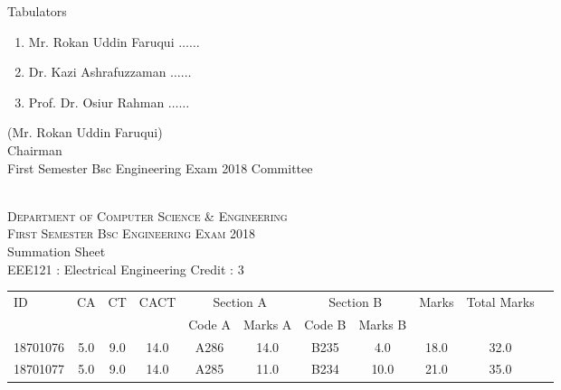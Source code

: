 \documentclass[12pt]{article}
\begin{document}
            \begin{table}[hb]
            	\centering
            \begin{minipage}[b]{0.5\linewidth} %
            {\centering Tabulators }
            \begin{enumerate}
                \item Mr. Rokan Uddin Faruqui \hspace*{1ex} $\ldots \ldots  $  
                \item Dr. Kazi Ashrafuzzaman \hspace*{1ex} $\ldots \ldots  $  
                \item Prof. Dr. Osiur Rahman \hspace*{1ex} $\ldots \ldots $  
            \end{enumerate} 

            \end{minipage}
            \hspace*{1.2cm}
            \begin{minipage}[b]{0.4\linewidth} \centering
            (Mr. Rokan Uddin Faruqui) \\
            Chairman  \hspace*{1ex} \\
           First Semester Bsc Engineering Exam 2018 Committee
            \end{minipage}
            \end{table}
            \clearpage
    \centering
    \begin{minipage}[m]{.8\textwidth} \centering 
	\smallskip
	\\
	\textsc{Department of Computer Science \& Engineering}\\
	\textsc{ First Semester Bsc Engineering Exam 2018}\\
    {\large {\sc Summation Sheet}}\\  
     {\centering EEE121 : Electrical Engineering     Credit : 3 } \\
    \end{minipage} 
    \begin{center} 
	\renewcommand{\arraystretch}{1.08}
	\begin{small}
    \begin{tabular}{|l|c|c|c|c|c|c|c|c|c|c|} \hline
	\multirow{2}{*}{ID} & 	\multirow{2}{*}{CA}  & 	\multirow{2}{*}{CT}  & 	\multirow{2}{*}{CACT}  & \multicolumn{2 }{c|}{Section A}& \multicolumn{2 }{c|}{Section B} & 	\multirow{2}{*}{Marks}  & 	\multirow{2}{*}{Total Marks}  \\ 
	&  &  &  & Code A & Marks A & Code B & Marks B&  &  \\ \hline
18701076 & 5.0 & 9.0 & 14.0 & A286 & 14.0 & B235 & 4.0 & 18.0 & 32.0\\ \hline 
18701077 & 5.0 & 9.0 & 14.0 & A285 & 11.0 & B234 & 10.0 & 21.0 & 35.0\\ \hline 
        \end{tabular}
            \end{small}
            \end{center}
  \centering
            
\end{document}

